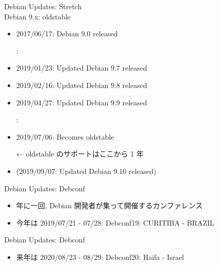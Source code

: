 \documentclass[cjk,c,squeeze,shrink,dvipdfmx,12pt]{beamer}
\begin{document}
\begin{frame}[fragile]{%
    Debian Updates: Stretch%
    \\[-.5em]{\normalsize{Debian 9.x: oldstable}}
  }
  \pause
  \begin{itemize}[<+->]
  \item 2017/06/17: Debian 9.0 released
  \item[] :
  \item 2019/01/23: Updated Debian 9.7 released
  \item 2019/02/16: Updated Debian 9.8 released
  \item 2019/04/27: Updated Debian 9.9 released
  \item[] :
  \item \alert{2019/07/06: Becomes oldstable}
  \item[←] oldstable のサポートはここから 1 年
  \item (2019/09/07: Updated Debian 9.10 released)
  \end{itemize}
\end{frame}


\begin{frame}[fragile]{Debian Updates: Debconf}
  \begin{itemize}
  \item 年に一回, Debian 開発者が集って開催するカンファレンス
  \item 今年は
    \alert{2019/07/21 - 07/28: Debconf19: CURITIBA - BRAZIL}
  \end{itemize}
  \begin{center}
  \end{center}
\end{frame}

{%
  \begin{frame}
    \centering
  \end{frame}
}

\begin{frame}[fragile]{Debian Updates: Debconf}
  \begin{itemize}
  \item 来年は 2020/08/23 - 08/29: Debconf20: Haifa - Israel
    \begin{center}
    \end{center}
  \end{itemize}
\end{frame}
\end{document}
